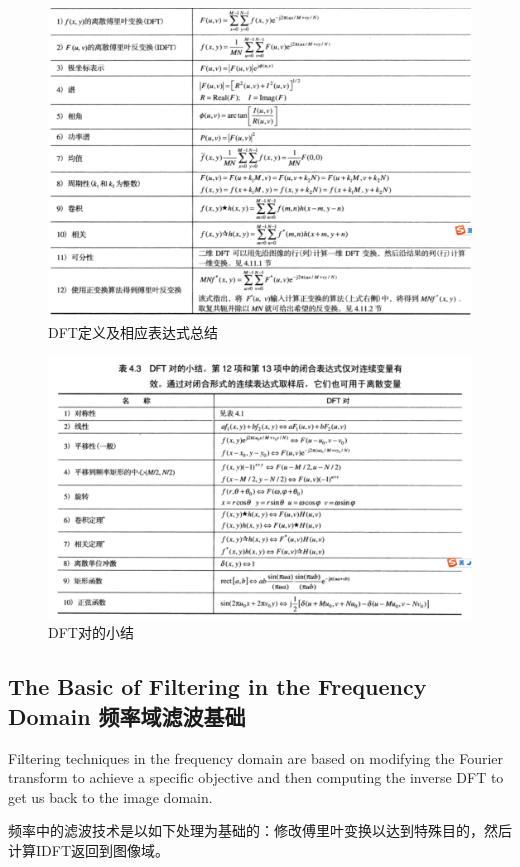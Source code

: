 \documentclass[12pt]{article}
\numberwithin{equation}{section}%
\begin{document}
\begin{figure}[!htb] %
\centering
\includegraphics[width=1\textwidth]{DFTsummary.png}
\caption{DFT定义及相应表达式总结}
\label{fig:2}
\end{figure}\newpage

\begin{figure}[!htb] %
\centering
\includegraphics[width=1\textwidth]{summary_of_DFTpairs.png}
\caption{DFT对的小结}
\label{fig:3}
\end{figure}\newpage



\subsection{The Basic of Filtering in the Frequency Domain 频率域滤波基础}

Filtering techniques in the frequency domain are based on modifying the Fourier transform to achieve a specific objective and then computing the inverse DFT to get us back to the image domain.

频率中的滤波技术是以如下处理为基础的：修改傅里叶变换以达到特殊目的，然后计算IDFT返回到图像域。





\end{document}
